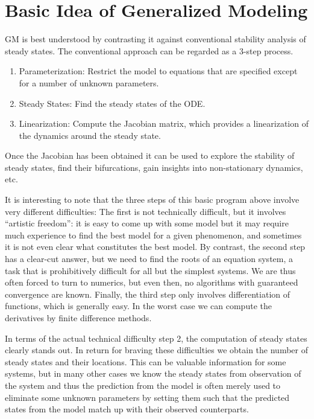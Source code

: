 \documentclass{article}
\begin{document}
\section{Basic Idea of Generalized Modeling}
GM is best understood by contrasting it against conventional stability analysis of steady states.
The conventional approach can be regarded as a 3-step process.
\begin{enumerate}
\item Parameterization: Restrict the model to equations that are specified except for a number of unknown parameters. 
\item Steady States: Find the steady states of the ODE.
\item Linearization: Compute the Jacobian matrix, which provides a linearization of the dynamics around the steady state. 
\end{enumerate}
Once the Jacobian has been obtained it can be used to explore the stability of steady states, find their bifurcations,
gain insights into non-stationary dynamics, etc. 

It is interesting to note that the three steps of this basic program above involve very different difficulties: The first is 
not technically difficult, but it involves ``artistic freedom'': it is easy to come up with some model but it may require much experience to find the best model for a given phenomenon, and sometimes it is not even clear what constitutes the best model. By contrast, the second step has a clear-cut answer, but we need to find the roots of an equation system, a task that is prohibitively difficult for all but the simplest systems. We are thus often forced to turn to numerics, but even then, no algorithms with guaranteed convergence are known. Finally, the third step only involves differentiation of functions, which is generally easy. In the worst case we can compute the derivatives by finite difference methods.

In terms of the actual technical difficulty step 2, the computation of steady states clearly stands out. In return for braving these 
difficulties we obtain the number of steady states and their locations. This can be valuable information for some systems, but in many other cases we know the steady states from observation of the system and thus the prediction from the model is often merely used to eliminate some unknown parameters by setting them such that the predicted states from the model match up with their observed counterparts.
\end{document}
